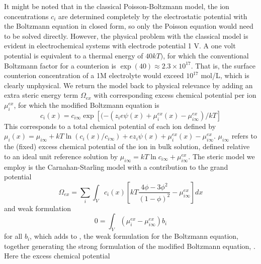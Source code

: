 It might be noted that in the classical Poisson-Boltzmann model, the
ion concentrations $c_i$ are determined completely by the
electrostatic potential with the Boltzmann equation in closed form, so
only the Poisson equation would need to be solved directly. However, the
physical problem with the classical model is evident in electrochemical
systems with electrode potential 1 V. A one volt potential is
equivalent to a thermal energy of $40 kT)$, for which the conventional
Boltzmann factor for a counterion is
$\exp(40)\approx 2.3 \times 10^{17}$.  That is, the surface counterion
concentration of a 1M electrolyte would exceed $10^{17}$ mol/L, which
is clearly unphysical.  We return the model back to physical
relevance by adding an extra steric energy term $\Omega_{ex}$ with
corresponding excess chemical potential per ion $\mu_{i}^{ex}$, for
which the modified Boltzmann equation is
\begin{equation}
    c_i(x)=c_{i\infty}\exp\left[(-(z_i e \psi(x) + \mu_i^{ex}(x)-\mu_{i\infty}^{ex})/kT\right]
    \label{general_Boltzmann}
\end{equation}
This corresponds to a total chemical potential of each ion 
defined by $\mu_i(x)=\mu_{i\infty} + kT \ln(c_i(x)/c_{i\infty})
+ ez_i \psi(x) + \mu_i^{ex}(x)-\mu_{i\infty}^{ex}$.
$\mu_{i\infty}$ refers to the (fixed) excess chemical potential of the
ion in bulk solution, defined relative to an ideal unit
reference solution by $\mu_{i\infty} = kT\ln c_{i\infty} + \mu_{i\infty}^{ex}$.
The steric model we employ is the Carnahan-Starling model
\cite{CarnahanStarling1969} with a contribution to the grand potential
\begin{equation}
    \Omega_{ex} = \sum_{i} \int_{V} c_{i}(x) \left[ kT
    \frac{4\phi - 3\phi^2}{(1-\phi)^2}
    -  \mu_{i\infty}^{ex}
  \right]dx
  \label{CS_energy_functional}
\end{equation}
and weak formulation
\begin{equation}
    0 = \int_{V} (\mu_i^{ex}-\mu_{i\infty}^{ex}) b_i
    \label{weak_CS}
\end{equation}
for all $b_i$, which adds to , the weak
formulation for the Boltzmann equation, together generating the strong
formulation of the modified Boltzmann
equation,  .  Here the excess chemical potential
